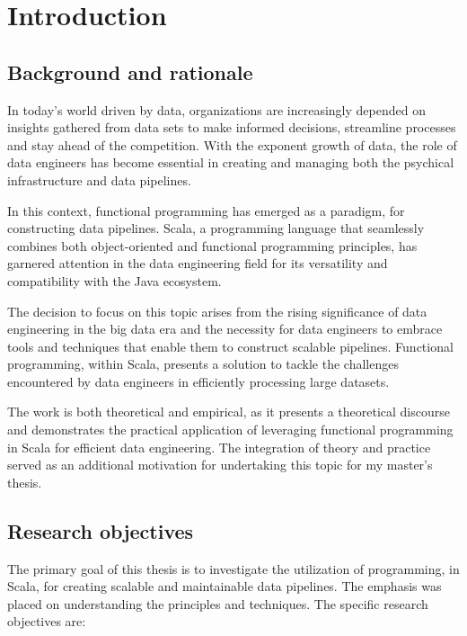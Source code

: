 \setcounter{page}{1}
\chapter*{Introduction}

\section*{Background and rationale}

In today's world driven by data, organizations are increasingly depended on insights gathered from data sets to make informed decisions, streamline processes and stay ahead of the competition. With the exponent growth of data, the role of data engineers has become essential in creating and managing both the psychical infrastructure and data pipelines.

In this context, functional programming has emerged as a paradigm, for constructing data pipelines. Scala, a programming language that seamlessly combines both object-oriented and functional programming principles, has garnered attention in the data engineering field for its versatility and compatibility with the Java ecosystem.

The decision to focus on this topic arises from the rising significance of data engineering in the big data era and the necessity for data engineers to embrace tools and techniques that enable them to construct scalable pipelines. Functional programming, within Scala, presents a solution to tackle the challenges encountered by data engineers in efficiently processing large datasets.

The work is both theoretical and empirical, as it presents a theoretical discourse and demonstrates the practical application of leveraging functional programming in Scala for efficient data engineering. The integration of theory and practice served as an additional motivation for undertaking this topic for my master's thesis.

\section*{Research objectives}

The primary goal of this thesis is to investigate the utilization of programming, in Scala, for creating scalable and maintainable data pipelines. The emphasis was placed on understanding the principles and techniques. The specific research objectives are:


